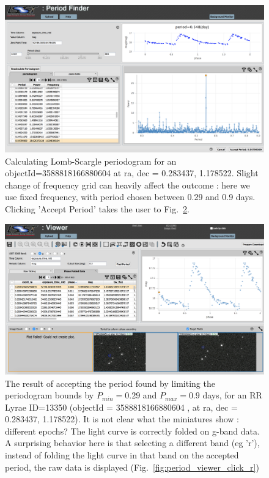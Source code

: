 \documentclass[DM,lsstdraft,toc]{lsstdoc}
\begin{document}
\begin{figure}
\includegraphics[width=\textwidth]{figs/Period_finder_fix_freq_029-09_best}
\caption{Calculating Lomb-Scargle periodogram for an objectId=3588818166880604 at  ra, dec = 0.283437\degree, 1.178522\degree. Slight change of frequency grid can heavily affect the outcome  : here we use fixed frequency, with period chosen between 0.29 and 0.9 days.
Clicking 'Accept Period' takes the user to Fig.~\ref{fig:period_viewer_accept_period}.}
\label{fig:period_finder_best_bounds}
\end{figure}




\begin{figure}
\includegraphics[width=\textwidth]{figs/Period_viewer_fix_freq_029-09_best}
\caption{The result of accepting the period found by limiting the periodogram bounds by $P_{min} =  0.29 $ and $P_{max} = 0.9$ days, for an RR Lyrae ID=13350 (objectId = 3588818166880604 , at  ra, dec = 0.283437\degree, 1.178522\degree). It is not clear what the miniatures show : different epochs?  The light curve is correctly folded on g-band data. A surprising behavior here is that selecting a different band (eg 'r'), instead of folding the light curve in that band  on the accepted period, the raw data is displayed (Fig.~\ref{fig:period_viewer_click_r})  }
\label{fig:period_viewer_accept_period}
\end{figure}
\end{document}
